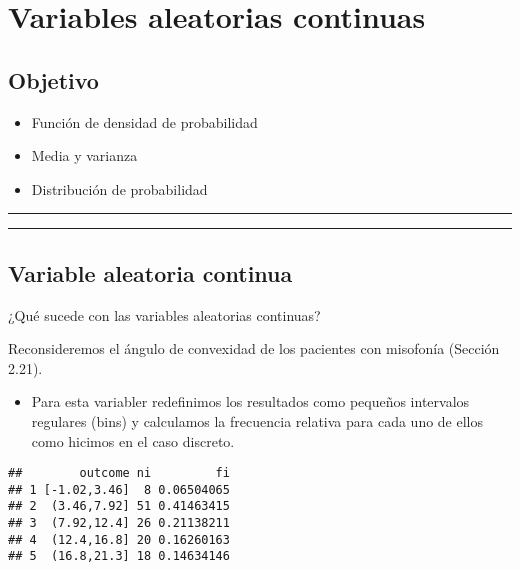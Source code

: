 \documentclass[
]{book}
\providecommand{\tightlist}{%
  \setlength{\itemsep}{0pt}\setlength{\parskip}{0pt}}
\begin{document}
\hypertarget{variables-aleatorias-continuas}{%
\chapter{Variables aleatorias continuas}\label{variables-aleatorias-continuas}}

\hypertarget{objetivo-5}{%
\section{Objetivo}\label{objetivo-5}}

\begin{itemize}
\tightlist
\item
  Función de densidad de probabilidad
\item
  Media y varianza
\item
  Distribución de probabilidad
\end{itemize}

\begin{center}\rule{0.5\linewidth}{0.5pt}\end{center}

\begin{center}\rule{0.5\linewidth}{0.5pt}\end{center}

\hypertarget{variable-aleatoria-continua}{%
\section{Variable aleatoria continua}\label{variable-aleatoria-continua}}

¿Qué sucede con las variables aleatorias continuas?

Reconsideremos el ángulo de convexidad de los pacientes con misofonía (Sección 2.21).

\begin{itemize}
\tightlist
\item
  Para esta variabler redefinimos los resultados como pequeños intervalos regulares (bins) y calculamos la frecuencia relativa para cada uno de ellos como hicimos en el caso discreto.
\end{itemize}

\begin{verbatim}
##        outcome ni         fi
## 1 [-1.02,3.46]  8 0.06504065
## 2  (3.46,7.92] 51 0.41463415
## 3  (7.92,12.4] 26 0.21138211
## 4  (12.4,16.8] 20 0.16260163
## 5  (16.8,21.3] 18 0.14634146
\end{verbatim}
\end{document}
